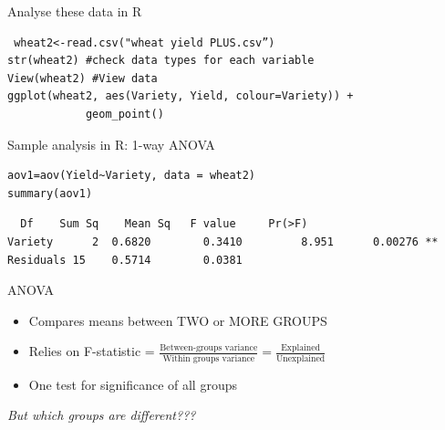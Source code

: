 \documentclass[10pt]{beamer}
\makeatletter
\newenvironment{kframe}{%
 \def\at@end@of@kframe{}%
 \ifinner\ifhmode%
  \def\at@end@of@kframe{\end{minipage}}%
  \begin{minipage}{\columnwidth}%
 \fi\fi%
 \def\FrameCommand##1{\hskip\@totalleftmargin \hskip-\fboxsep
 \colorbox{shadecolor}{##1}\hskip-\fboxsep
     \hskip-\linewidth \hskip-\@totalleftmargin \hskip\columnwidth}%
 \MakeFramed {\advance\hsize-\width
   \@totalleftmargin\z@ \linewidth\hsize
   \@setminipage}}%
 {\par\unskip\endMakeFramed%
 \at@end@of@kframe}
\newenvironment{knitrout}{}{} %
\makeatother
\begin{document}
\begin{frame}[fragile]{Analyse these data in R}
 
 \begin{knitrout}
\color{fgcolor}\begin{kframe}
\footnotesize
\begin{verbatim}
 wheat2<-read.csv("wheat yield PLUS.csv”)
str(wheat2) #check data types for each variable
View(wheat2) #View data
ggplot(wheat2, aes(Variety, Yield, colour=Variety)) +
            geom_point()
\end{verbatim}
\end{kframe}
\end{knitrout}

\end{frame}

\begin{frame}[fragile]{Sample analysis in R: 1-way ANOVA}
 
  \begin{knitrout}
\color{fgcolor}\begin{kframe}
\footnotesize
\begin{verbatim}
aov1=aov(Yield~Variety, data = wheat2)
summary(aov1)
\end{verbatim}
\end{kframe}
\end{knitrout}
 
   \begin{knitrout}
\color{fgcolor}\begin{kframe}
\footnotesize
\begin{verbatim}
  Df 	Sum Sq    Mean Sq 	F value  	Pr(>F)   
Variety      2 	0.6820        0.3410         8.951 		0.00276 **
Residuals 15 	0.5714        0.0381   
\end{verbatim}
\end{kframe}
\end{knitrout}
 
 \begin{alertblock}{ANOVA}
 \begin{itemize}
  \item Compares means between TWO or MORE GROUPS
  \item Relies on F-statistic = $\frac{\text{Between-groups variance}}{\text{Within groups variance}} = \frac{\text{Explained}}{\text{Unexplained}}$ 
  \item One test for significance of all groups
 \end{itemize}
 \end{alertblock}
 
 \pause
 
 \emph{But which groups are different???}
\end{frame}
\end{document}
